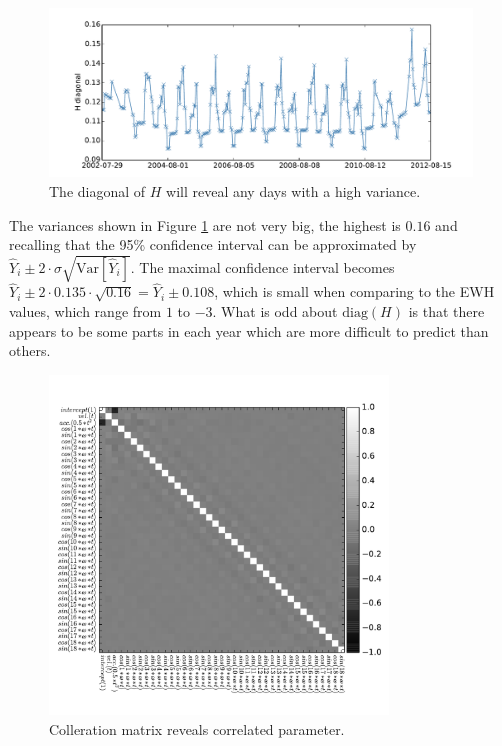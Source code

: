 \begin{figure}[H]
	\centering
	\includegraphics[width=\textwidth]{figures/ols-world-diagnostics-diagH}
	\caption{The diagonal of $H$ will reveal any days with a high variance.}
	\label{fig:ols-world-performance-diagH}
\end{figure}

The variances shown in Figure \ref{fig:ols-world-performance-diagH} are not very big, the highest is $0.16$ and recalling that the 95\% confidence interval can be approximated by $\hat{Y}_i \pm 2 \cdot \hat{\sigma} \sqrt{\mathrm{Var}[\hat{Y}_i]}$. The maximal confidence interval becomes $\hat{Y}_i \pm 2 \cdot 0.135 \cdot \sqrt{0.16} = \hat{Y}_i \pm 0.108$, which is small when comparing to the EWH values, which range from $1$ to $-3$. What is odd about $\mathrm{diag}(H)$ is that there appears to be some parts in each year which are more difficult to predict than others. 

\begin{figure}[H]
	\centering
	\includegraphics[height=9cm]{figures/ols-world-diagnostics-cov}
	\caption{Colleration matrix reveals correlated parameter.}
	\label{fig:ols-world-performance-cov}
\end{figure}

